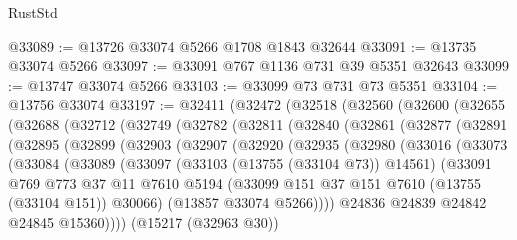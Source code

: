 \begin{lexlean}{RustStd}
\begin{coremodule}
@33089 := @13726 @33074 @5266 @1708 @1843 @32644
@33091 := @13735 @33074 @5266
@33097 := @33091 @767 @1136 @731 @39 @5351 @32643
@33099 := @13747 @33074 @5266
@33103 := @33099 @73 @731 @73 @5351
@33104 := @13756 @33074
@33197 := @32411
    (@32472
      (@32518
        (@32560
          (@32600
            (@32655
              (@32688
                (@32712
                  (@32749
                    (@32782
                      (@32811
                        (@32840
                          (@32861
                            (@32877
                              (@32891
                                (@32895
                                  (@32899
                                    (@32903
                                      (@32907
                                        (@32920
                                          (@32935
                                            (@32980
                                              (@33016
                                                (@33073
                                                  (@33084
                                                    (@33089
                                                      (@33097
                                                        (@33103 (@13755 (@33104 @73)) @14561)
                                                        (@33091
                                                          @769
                                                          @773
                                                          @37
                                                          @11
                                                          @7610
                                                          @5194
                                                          (@33099
                                                            @151
                                                            @37
                                                            @151
                                                            @7610
                                                            (@13755 (@33104 @151))
                                                            @30066)
                                                          (@13857 @33074 @5266))))
                                                    @24836
                                                    @24839
                                                    @24842
                                                    @24845
                                                    @15360))))
                                            (@15217 (@32963 @30))

\end{coremodule}
\end{lexlean}
